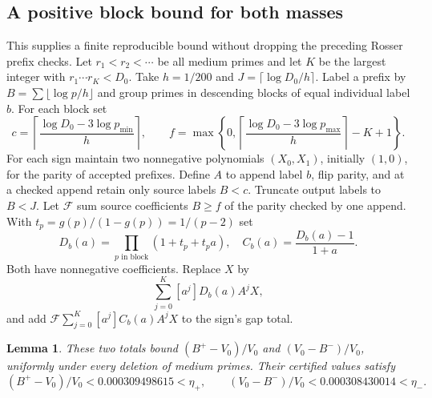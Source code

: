 \documentclass[11pt]{article}
\newtheorem{lemma}[theorem]{Lemma}
\theoremstyle{remark}\newtheorem{remark}[theorem]{Remark}
\begin{document}
\subsection{A positive block bound for both masses}
This supplies a finite reproducible bound without dropping the preceding
Rosser prefix checks. Let $r_1<r_2<\cdots$ be all medium primes and let
$K$ be the largest integer with $r_1\cdots r_K<D_0$.
Take $h=1/200$ and $J=\lceil\log D_0/h\rceil$.
Label a prefix by $B=\sum\lfloor\log p/h\rfloor$ and group primes in
descending blocks of equal individual label $b$.
For each block set
\[
c=\left\lceil\frac{\log D_0-3\log p_{\min}}h\right\rceil,\qquad
f=\max\left\{0,\left\lceil\frac{\log D_0-3\log p_{\max}}h\right\rceil-K+1\right\}.
\]
For each sign maintain two nonnegative polynomials $(X_0,X_1)$,
initially $(1,0)$, for the parity of accepted prefixes.
Define $A$ to append label $b$, flip parity, and at a checked append
retain only source labels $B<c$. Truncate output labels to $B<J$.
Let $\mathcal F$ sum source coefficients $B\ge f$ of the parity checked
by one append. With $t_p=g(p)/(1-g(p))=1/(p-2)$ set
\[
D_b(a)=\prod_{p\text{ in block}}(1+t_p+t_pa),\quad
C_b(a)=\frac{D_b(a)-1}{1+a}.
\]
Both have nonnegative coefficients. Replace $X$ by
\[
\sum_{j=0}^K[a^j]D_b(a)A^jX,
\]
and add $\mathcal F\sum_{j=0}^K[a^j]C_b(a)A^jX$ to the sign's gap total.
\begin{lemma}\label{lem:block}
These two totals bound $(B^+-V_0)/V_0$ and $(V_0-B^-)/V_0$,
uniformly under every deletion of medium primes. Their certified values
satisfy
\[
(B^+-V_0)/V_0<0.000309498615<\eta_+,\qquad
(V_0-B^-)/V_0<0.000308430014<\eta_-.
\]
\end{lemma}
\end{document}
